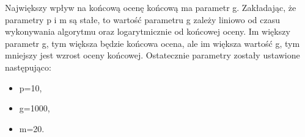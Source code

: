 Największy wpływ na końcową ocenę końcową ma parametr g. Zakładając, że parametry p i m są stałe, to wartość parametru g zależy liniowo od czasu wykonywania algorytmu oraz logarytmicznie od końcowej oceny. Im większy parametr g, tym większa będzie końcowa ocena, ale im większa wartość g, tym mniejszy jest wzrost oceny końcowej. Ostatecznie parametry zostały ustawione następująco:
\begin{itemize}
	\item p=10,
	\item g=1000,
	\item m=20.
\end{itemize}